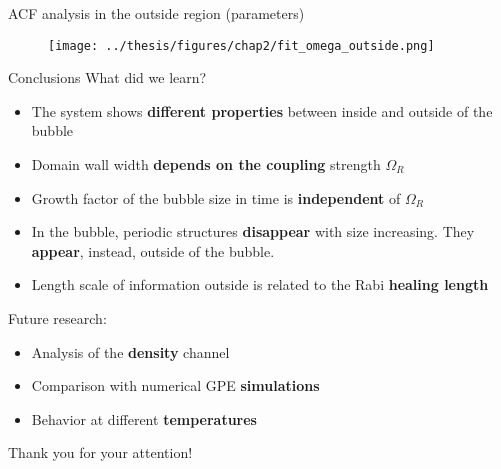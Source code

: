 \documentclass[aspectratio=169]{beamer}
\newcommand{\backupbegin}{
    \newcounter{finalframe}
    \setcounter{finalframe}{\value{framenumber}}
}
\newcommand{\backupend}{
    \setcounter{framenumber}{\value{finalframe}}
}
\begin{document}
\begin{frame}{ACF analysis in the outside region (parameters)}
  \begin{figure}
      \centering
      \texttt{[image: ../thesis/figures/chap2/fit\_omega\_outside.png]}
  \end{figure}
\end{frame}

\begin{frame}{Conclusions}
  What did we learn?
  \begin{itemize}
    \item The system shows \textbf{different properties} between inside and outside of the bubble
    \item Domain wall width \textbf{depends on the coupling} strength $\Omega_R$
    \item Growth factor of the bubble size in time is \textbf{independent} of $\Omega_R$
    \item In the bubble, periodic structures \textbf{disappear} with size increasing. They \textbf{appear}, instead, outside of the bubble.
    \item Length scale of information outside is related to the Rabi \textbf{healing length}
  \end{itemize}
  \pause
  Future research:
  \begin{itemize}
    \item Analysis of the \textbf{density} channel
    \item Comparison with numerical GPE \textbf{simulations}
    \item Behavior at different \textbf{temperatures}
  \end{itemize}
\end{frame}

\begin{frame}
  \huge
  Thank you for your attention!
\end{frame}

  
\end{document}
